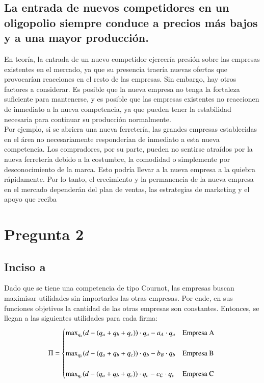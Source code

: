 \documentclass[
	spanish, %
	letterpaper, oneside
]{article}
\begin{document}
\subsection{La entrada de nuevos competidores en un oligopolio siempre conduce a precios más bajos y a una mayor producción.}
En teoría, la entrada de un nuevo competidor ejercería presión sobre las empresas existentes en el mercado, ya que su presencia traería nuevas ofertas que provocarían reacciones en el resto de las empresas. Sin embargo, hay otros factores a considerar. Es posible que la nueva empresa no tenga la fortaleza suficiente para mantenerse, y es posible que las empresas existentes no reaccionen de inmediato a la nueva competencia, ya que pueden tener la estabilidad necesaria para continuar su producción normalmente. \\

Por ejemplo, si se abriera una nueva ferretería, las grandes empresas establecidas en el área no necesariamente responderían de inmediato a esta nueva competencia. Los compradores, por su parte, pueden no sentirse atraídos por la nueva ferretería debido a la costumbre, la comodidad o simplemente por desconocimiento de la marca. Esto podría llevar a la nueva empresa a la quiebra rápidamente. Por lo tanto, el crecimiento y la permanencia de la nueva empresa en el mercado dependerán del plan de ventas, las estrategias de marketing y el apoyo que reciba

\section{Pregunta 2}\label{sec:pregunta-2}

\subsection{Inciso a}

Dado que se tiene una competencia de tipo Cournot, las empresas buscan maximisar utilidades sin importarles las otras empresas.
Por ende, en sus funciones objetivos la cantidad de las otras empresas son constantes. Entonces, se llegan a las siguientes utilidades
para cada firma: \\

$$\Pi=\begin{cases}\text{max}_{q_a}(d-(q_a+q_b+q_c))\cdot q_a - a_A\cdot q_a&\text{Empresa A}\\\\
				\text{max}_{q_b}(d-(q_a+q_b+q_c))\cdot q_b - b_B\cdot q_b&\text{Empresa B}\\\\
				\text{max}_{q_c}(d-(q_a+q_b+q_c))\cdot q_c - c_C\cdot q_c&\text{Empresa C}\end{cases}\\$$
\end{document}
